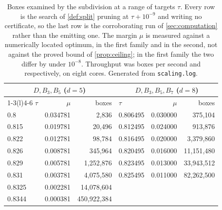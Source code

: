\begin{table}[t]
\centering
\begin{tabular}{lrr@{\qquad}lrr}
\toprule
\multicolumn{3}{c}{$D,B_3,B_5$ \quad($d=5$)} &
\multicolumn{3}{c}{$D,B_3,B_5,B_7$ \quad($d=8$)}\\
\cmidrule(r){1-3}\cmidrule(l){4-6}
$\tau$ & $\mu$ & boxes & $\tau$ & $\mu$ & boxes\\
\midrule
0.8 & 0.034781 & 2{,}836 & 0.806495 & 0.030000 & 375{,}104\\
0.815 & 0.019781 & 20{,}496 & 0.812495 & 0.024000 & 913{,}876\\
0.822 & 0.012781 & 98{,}784 & 0.816495 & 0.020000 & 3{,}379{,}860\\
0.826 & 0.008781 & 345{,}964 & 0.820495 & 0.016000 & 11{,}151{,}480\\
0.829 & 0.005781 & 1{,}252{,}876 & 0.823495 & 0.013000 & 33{,}943{,}512\\
0.831 & 0.003781 & 4{,}075{,}580 & 0.825495 & 0.011000 & 82{,}262{,}500\\
0.8325 & 0.002281 & 14{,}078{,}604 &  & & \\
0.8344 & 0.000381 & 450{,}922{,}384 &  & & \\
\bottomrule
\end{tabular}
\caption{Boxes examined by the subdivision at a range of targets $\tau$. Every
row is the search of \cref{def:split} pruning at $\tau+10^{-9}$ and writing no
certificate, so the last row is the corroborating run of \cref{sec:computation}
rather than the emitting one. The margin $\mu$ is measured against a numerically
located optimum, \FiveDOptimum{} in the first family and \EightDOptimum{} in the
second, not against the proved bound of \cref{prop:ceiling}; in the first family
the two differ by under $10^{-8}$. Throughput was \ThroughputFive{} boxes per
second and \ThroughputEight{} respectively, on eight cores. Generated from
\texttt{scaling.log}.}
\label{tab:scaling}
\end{table}
